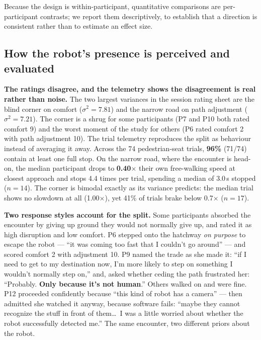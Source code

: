 Because the design is within-participant, quantitative comparisons are
per-participant contrasts; we report them descriptively, to establish
that a direction is consistent rather than to estimate an effect size.

\subsection{How the robot's presence is perceived and evaluated}
\label{sec:study:rq1}

\textbf{The ratings disagree, and the telemetry shows the disagreement
is real rather than noise.} The two largest variances in the session
rating sheet are the blind corner on comfort ($\sigma^2 = 7.81$) and
the narrow road on path adjustment ($\sigma^2 = 7.21$). The corner is a
shrug for some participants (P7 and P10 both rated comfort 9) and the
worst moment of the study for others (P6 rated comfort 2 with path
adjustment 10). The trial telemetry reproduces the split as behaviour
instead of averaging it away. Across the 74 pedestrian-seat trials,
\textbf{96\%} (71/74) contain at least one full stop. On the narrow
road, where the encounter is head-on, the median participant drops to
\textbf{0.40$\times$} their own free-walking speed at closest approach
and stops 4.4 times per trial, spending a median of 3.0\,s stopped
($n=14$). The corner is bimodal exactly as its variance predicts: the
median trial shows no slowdown at all (1.00$\times$), yet 41\% of
trials brake below 0.7$\times$ ($n=17$).

\textbf{Two response styles account for the split.} Some participants
absorbed the encounter by giving up ground they would not normally give
up, and rated it as high disruption and low comfort. P6 stepped onto
the hatchway \emph{on purpose} to escape the robot --- ``it was coming
too fast that I couldn't go around'' --- and scored comfort 2 with
adjustment 10. P9 named the trade as she made it: ``if I need to get to
my destination now, I'm more likely to step on something I wouldn't
normally step on,'' and, asked whether ceding the path frustrated her:
``Probably. \textbf{Only because it's not human}.'' Others walked on
and were fine. P12 proceeded confidently because ``this kind of robot
has a camera'' --- then admitted she watched it anyway, because
software fails: ``maybe they cannot recognize the stuff in front of
them\dots\ I was a little worried about whether the robot successfully
detected me.'' The same encounter, two different priors about the
robot.

